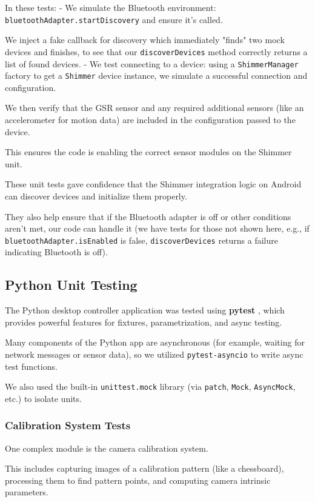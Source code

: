 {{In these tests: - We simulate the Bluetooth environment:
\texttt{bluetoothAdapter.startDiscovery} and ensure it's called.

We inject a fake callback for discovery which immediately "finds" two mock devices
and finishes, to see that our \texttt{discoverDevices} method correctly returns a
list of found devices.  - We test connecting to a device: using a
\texttt{ShimmerManager} factory to get a \texttt{Shimmer} device instance, we
simulate a successful connection and configuration.

We then verify that the GSR sensor and any required additional sensors (like an
accelerometer for motion data) are included in the configuration passed to the
device.

This ensures the code is enabling the correct sensor modules on the Shimmer unit.

These unit tests gave confidence that the Shimmer integration logic on Android can
discover devices and initialize them properly.

They also help ensure that if the Bluetooth adapter is off or other conditions aren't
met, our code can handle it (we have tests for those not shown here, e.g., if
\texttt{bluetoothAdapter.isEnabled} is false, \texttt{discoverDevices} returns a
failure indicating Bluetooth is off).

\subsection{Python Unit Testing}

The Python desktop controller application was tested using \textbf{pytest}
, which provides powerful features for fixtures, parametrization, and async testing.

Many components of the Python app are asynchronous (for example, waiting for network
messages or sensor data), so we utilized \texttt{pytest-asyncio} to write async test
functions.

We also used the built-in \texttt{unittest.mock} library (via \texttt{patch},
\texttt{Mock}, \texttt{AsyncMock}, etc.) to isolate units.

\subsubsection{Calibration System Tests}

One complex module is the camera calibration system.

This includes capturing images of a calibration pattern (like a chessboard),
processing them to find pattern points, and computing camera intrinsic parameters.

}}
